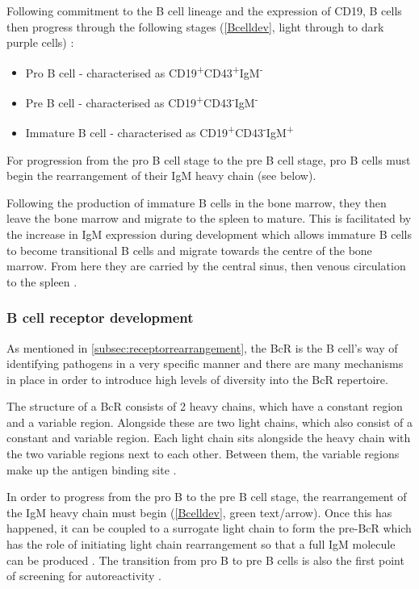Following commitment to the B cell lineage and the expression of CD19, B cells then progress through the following stages (\cref{Bcelldev}, light through to dark purple cells) \citep{Cambier2007}:
\begin{itemize}
\item Pro B cell - characterised as CD19\textsuperscript{+}CD43\textsuperscript{+}IgM\textsuperscript{-}
\item Pre B cell - characterised as CD19\textsuperscript{+}CD43\textsuperscript{-}IgM\textsuperscript{-}
\item Immature B cell - characterised as CD19\textsuperscript{+}CD43\textsuperscript{-}IgM\textsuperscript{+}
\end{itemize}

For progression from the pro B cell stage to the pre B cell stage, pro B cells must begin the rearrangement of their IgM heavy chain (see below).

Following the production of immature B cells in the bone marrow, they then leave the bone marrow and migrate to the spleen to mature.
This is facilitated by the increase in IgM expression during development which allows immature B cells to become transitional B cells and migrate towards the centre of the bone marrow. 
From here they are carried by the central sinus, then venous circulation to the spleen \citep{Loder1999}.


\subsubsection{B cell receptor development}
\label{subsubsec:Bcellrecepdevelopment}

As mentioned in \cref{subsec:receptorrearrangement}, the BcR is the B cell's way of identifying pathogens in a very specific manner and there are many mechanisms in place in order to introduce high levels of diversity into the BcR repertoire.

The structure of a BcR consists of 2 heavy chains, which have a constant region and a variable region.
Alongside these are two light chains, which also consist of a constant and variable region.
Each light chain sits alongside the heavy chain with the two variable regions next to each other.
Between them, the variable regions make up the antigen binding site \citep{Pieper2013}.


In order to progress from the pro B to the pre B cell stage, the rearrangement of the IgM heavy chain must begin (\cref{Bcelldev}, green text/arrow).
Once this has happened, it can be coupled to a surrogate light chain to form the pre-BcR which has the role of initiating light chain rearrangement so that a full IgM molecule can be produced \citep{Burrows2002}.
The transition from pro B to pre B cells is also the first point of screening for autoreactivity \citep{Pieper2013}.


